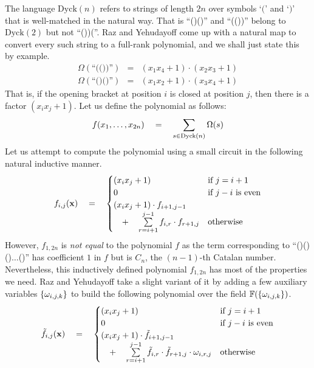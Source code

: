 The language $\mathrm{Dyck}(n)$ refers to strings of length $2n$ over symbols `$($' and `$)$' that is well-matched in the natural way. 
That is ``()()'' and ``(())'' belong to $\mathrm{Dyck}(2)$ but not ``())(''. 
Raz and Yehudayoff come up with a natural map to convert every such string to a full-rank polynomial, and we shall just state this by example. 
\begin{eqnarray*}
\Omega(\text{``(())''}) & = & (x_1x_4 + 1)\cdot (x_2x_3 + 1)\\
\Omega(\text{``()()''}) & = & (x_1x_2 + 1)\cdot (x_3x_4 + 1)
\end{eqnarray*}
That is, if the opening bracket at position $i$ is closed at position $j$, then there is a factor $(x_ix_j + 1)$. 
Let us define the polynomial as follows:
\[
f(x_1,\dots, x_{2n}) \quad = \quad \sum_{s\in \mathrm{Dyck}(n)} \Omega(s) 
\]
Let us attempt to compute the polynomial using a small circuit in the following natural inductive manner. 
\[
f_{i,j}(\mathbf{x}) \quad = \quad \begin{cases}
(x_ix_j+1) & \text{if $j = i+1$}\\
0 & \text{if $j-i$ is even}\\
(x_ix_j+1) \cdot f_{i+1,j-1} &\\
 \quad + \quad \sum\limits_{r=i+1}^{j-1} f_{i,r}\cdot f_{r+1,j} & \text{otherwise}
\end{cases}
\]
However, $f_{1,2n}$ is \emph{not equal} to the polynomial $f$ as the term corresponding to ``()()()$\dots$()'' has coefficient $1$ in $f$ but is $C_n$, the $(n-1)$-th Catalan number. 
Nevertheless, this inductively defined polynomial $f_{1,2n}$ has most of the properties we need. 
Raz and Yehudayoff take a slight variant of it by adding a few auxiliary variables $\left\{\omega_{i,j,k}\right\}$ to build the following polynomial over the field $\mathbb{F}(\left\{\omega_{i,j,k}\right\})$. 
\[
\tilde{f}_{i,j}(\mathbf{x}) \quad = \quad \begin{cases}
(x_ix_j+1) & \text{if $j = i+1$}\\
0 & \text{if $j-i$ is even}\\
(x_ix_j+1) \cdot \tilde{f}_{i+1,j-1} &\\
 \quad + \quad \sum\limits_{r=i+1}^{j-1} \tilde{f}_{i,r}\cdot \tilde{f}_{r+1,j} \cdot \omega_{i,r,j} & \text{otherwise}
\end{cases}
\]

